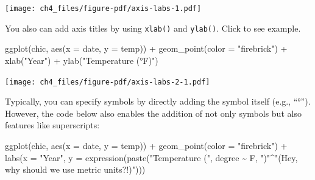 \documentclass[
  letterpaper,
]{scrbook}
\newenvironment{Shaded}{\begin{snugshade}}{\end{snugshade}}
\newcommand{\AttributeTok}[1]{\textcolor[rgb]{0.40,0.45,0.13}{#1}}
\newcommand{\FunctionTok}[1]{\textcolor[rgb]{0.28,0.35,0.67}{#1}}
\newcommand{\NormalTok}[1]{\textcolor[rgb]{0.00,0.23,0.31}{#1}}
\newcommand{\SpecialCharTok}[1]{\textcolor[rgb]{0.37,0.37,0.37}{#1}}
\newcommand{\StringTok}[1]{\textcolor[rgb]{0.13,0.47,0.30}{#1}}
\begin{document}
\texttt{[image: ch4\_files/figure-pdf/axis-labs-1.pdf]}

\begin{tcolorbox}[enhanced jigsaw, rightrule=.15mm, arc=.35mm, title=\textcolor{quarto-callout-tip-color}{\faLightbulb}\hspace{0.5em}{\texttt{xlab()} and \texttt{ylab()}}, colback=white, toptitle=1mm, colbacktitle=quarto-callout-tip-color!10!white, breakable, left=2mm, opacityback=0, leftrule=.75mm, bottomrule=.15mm, bottomtitle=1mm, colframe=quarto-callout-tip-color-frame, coltitle=black, toprule=.15mm, opacitybacktitle=0.6, titlerule=0mm]

You also can add axis titles by using \texttt{xlab()} and
\texttt{ylab()}. Click to see example.

\begin{Shaded}
\begin{Highlighting}[]
\FunctionTok{ggplot}\NormalTok{(chic, }\FunctionTok{aes}\NormalTok{(}\AttributeTok{x =}\NormalTok{ date, }\AttributeTok{y =}\NormalTok{ temp)) }\SpecialCharTok{+}
  \FunctionTok{geom\_point}\NormalTok{(}\AttributeTok{color =} \StringTok{"firebrick"}\NormalTok{) }\SpecialCharTok{+}
  \FunctionTok{xlab}\NormalTok{(}\StringTok{"Year"}\NormalTok{) }\SpecialCharTok{+}
  \FunctionTok{ylab}\NormalTok{(}\StringTok{"Temperature (°F)"}\NormalTok{)}
\end{Highlighting}
\end{Shaded}

\texttt{[image: ch4\_files/figure-pdf/axis-labs-2-1.pdf]}

\end{tcolorbox}

Typically, you can specify symbols by directly adding the symbol itself
(e.g., ``°''). However, the code below also enables the addition of not
only symbols but also features like superscripts:

\begin{Shaded}
\begin{Highlighting}[]
\FunctionTok{ggplot}\NormalTok{(chic, }\FunctionTok{aes}\NormalTok{(}\AttributeTok{x =}\NormalTok{ date, }\AttributeTok{y =}\NormalTok{ temp)) }\SpecialCharTok{+}
  \FunctionTok{geom\_point}\NormalTok{(}\AttributeTok{color =} \StringTok{"firebrick"}\NormalTok{) }\SpecialCharTok{+}
  \FunctionTok{labs}\NormalTok{(}\AttributeTok{x =} \StringTok{"Year"}\NormalTok{, }\AttributeTok{y =} \FunctionTok{expression}\NormalTok{(}\FunctionTok{paste}\NormalTok{(}\StringTok{"Temperature ("}\NormalTok{, degree }\SpecialCharTok{\textasciitilde{}}\NormalTok{ F, }\StringTok{")"}\SpecialCharTok{\^{}}\StringTok{"(Hey, why should we use metric units?!)"}\NormalTok{)))}
\end{Highlighting}
\end{Shaded}
\end{document}
